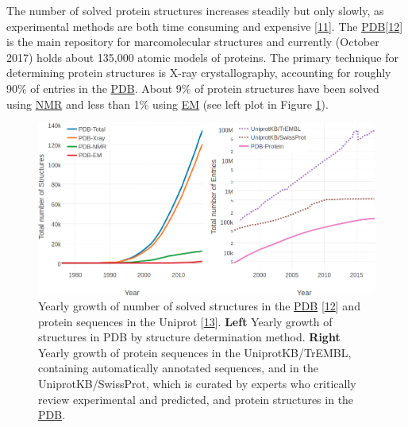 \documentclass[11pt,a4paper,twoside]{book}
\theoremstyle{definition}
\theoremstyle{definition}
\theoremstyle{remark}
\begin{document}
The number of solved protein structures increases steadily but only
slowly, as experimental methods are both time consuming and expensive
{[}\protect\hyperlink{ref-Dorn2014}{11}{]}. The
\protect\hyperlink{abbrev}{PDB}{[}\protect\hyperlink{ref-Berman2000}{12}{]}
is the main repository for marcomolecular structures and currently
(October 2017) holds about 135,000 atomic models of proteins. The
primary technique for determining protein structures is X-ray
crystallography, accounting for roughly 90\% of entries in the
\protect\hyperlink{abbrev}{PDB}. About 9\% of protein structures have
been solved using \protect\hyperlink{abbrev}{NMR} and less than 1\%
using \protect\hyperlink{abbrev}{EM} (see left plot in Figure
\ref{fig:seq-str-gap}).












\begin{figure}
\includegraphics[width=1\linewidth]{img/intro/pdb_uniprot_stats} \caption{Yearly growth of number of solved structures
in the \protect\hyperlink{abbrev}{PDB}
{[}\protect\hyperlink{ref-Berman2000}{12}{]} and protein sequences in
the Uniprot {[}\protect\hyperlink{ref-TheUniProtConsortium2017}{13}{]}.
\textbf{Left} Yearly growth of structures in PDB by structure
determination method. \textbf{Right} Yearly growth of protein sequences
in the UniprotKB/TrEMBL, containing automatically annotated sequences,
and in the UniprotKB/SwissProt, which is curated by experts who
critically review experimental and predicted, and protein structures in
the \protect\hyperlink{abbrev}{PDB}.}\label{fig:seq-str-gap}
\end{figure}
\end{document}

